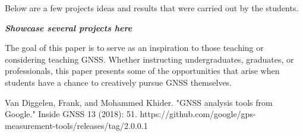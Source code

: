 \documentclass[12pt, conference, onecolumn, draftclsnofoot]{IEEEtran}
\begin{document}
Below are a few projects ideas and results that were carried out by the students.

\textit{\textbf{Showcase several projects here}}

The goal of this paper is to serve as an inspiration to those teaching or considering teaching GNSS.
Whether instructing undergraduates, graduates, or professionals, this paper presents some of the opportunities that arise when students have a chance to creatively pursue GNSS themselves.

\begin{thebibliography}{00}
     Van Diggelen, Frank, and Mohammed Khider. "GNSS analysis tools from Google." Inside GNSS 13 (2018): 51. 
     https://github.com/google/gps-measurement-tools/releases/tag/2.0.0.1
    
\end{thebibliography}
\end{document}
